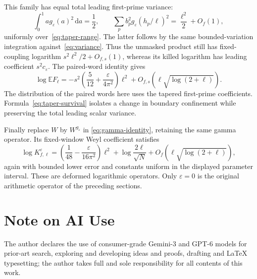\documentclass[11pt,reqno]{amsart}
\numberwithin{equation}{section}
\newcommand{\E}{\mathbb E}
\newcommand{\dd}{\,\mathrm d}
\begin{document}
This family has equal total leading first-prime variance:
\[
 \int_0^1ag_\varepsilon(a)^2\dd a=\frac12,
 \qquad
 \sum_pb_p^2g_\varepsilon(h_p/\ell)^2=\frac{\ell^2}{2}+O_f(1),
\]
uniformly over~\eqref{eq:taper-range}. The latter follows by
the same bounded-variation integration against~\eqref{eq:variance}.
Thus the unmasked product still has fixed-coupling logarithm
$s^2\ell^2/2+O_{f,s}(1)$, whereas its killed logarithm has
leading coefficient $s^2c_\varepsilon$. The paired-word identity
gives
\begin{equation}\label{eq:taper-survival}
 \log\E F_\ell
   =-s^2\left(\frac5{12}+\frac{\varepsilon}{4\pi^2}\right)\ell^2
                   +O_{f,s}(\ell\sqrt{\log(2+\ell)}).
\end{equation}
The distribution of the paired words here uses the tapered
first-prime coefficients. Formula~\eqref{eq:taper-survival}
isolates a change in boundary confinement while preserving
the total leading scalar variance.

Finally replace $W$ by $W^{g_\varepsilon}$ in
\eqref{eq:gamma-identity}, retaining the same gamma operator.
Its fixed-window Weyl coefficient satisfies
\begin{equation}\label{eq:taper-K}
 \log K_{f,\ell}^{\varepsilon}
  =\left(\frac1{48}-\frac{\varepsilon}{16\pi^2}\right)\ell^2
        +\log\frac{2\ell}{\sqrt N}
        +O_f(\ell\sqrt{\log(2+\ell)}),
\end{equation}
again with bounded lower error and constants uniform in the
displayed parameter interval. These are deformed logarithmic
operators. Only $\varepsilon=0$ is the original arithmetic
operator of the preceding sections.

\section*{Note on AI Use}
The author declares the use of consumer-grade Gemini-3 and GPT-6 models for prior-art search, exploring and developing ideas and proofs, drafting and LaTeX typesetting; the author takes full and sole responsibility for all contents of this work.
\end{document}
